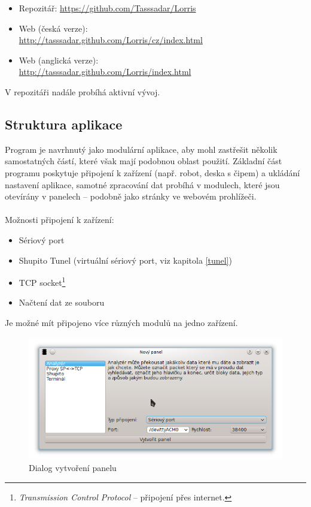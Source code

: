 \documentclass[12pt, a4paper, oneside]{article}
\newcommand{\It}{\textit}  %
\begin{document}
\begin{itemize}
    \item Repozitář: \url{https://github.com/Tasssadar/Lorris}
    \item Web (česká verze):\\ \url{http://tasssadar.github.com/Lorris/cz/index.html}
    \item Web (anglická verze):\\ \url{http://tasssadar.github.com/Lorris/index.html}
\end{itemize}
V repozitáři nadále probíhá aktivní vývoj.

\subsection{Struktura aplikace}
Program je navrhnutý jako modulární aplikace, aby mohl zastřešit několik samostatných částí, které však mají podobnou oblast použití. Základní část programu poskytuje připojení k zařízení (např. robot, deska s čipem) a ukládání nastavení aplikace, samotné zpracování dat probíhá v modulech, které jsou otevírány v panelech -- podobně jako stránky ve webovém prohlížeči.\\
\\
Možnosti připojení k zařízení:
\begin{itemize}
    \item Sériový port
    \item Shupito Tunel (virtuální sériový port, viz kapitola \ref{tunel})
    \item TCP socket\footnote{\It{Transmission Control Protocol} -- připojení přes internet.}
    \item Načtení dat ze souboru
\end{itemize}
Je možné mít připojeno více různých modulů na jedno zařízení.  

\begin{figure}[H]
\begin{center}
\includegraphics[width=\textwidth]{img/con_dialog.png}
\caption{Dialog vytvoření panelu}
\end{center}
\end{figure}
\end{document}
